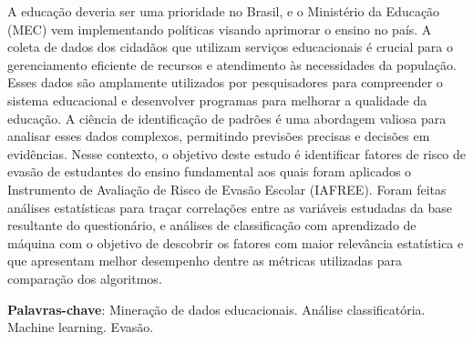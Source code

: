 
\setlength{\absparsep}{18pt} %
\begin{resumo}


A educação deveria ser uma prioridade no Brasil, e o Ministério da Educação (MEC) vem implementando políticas visando aprimorar o ensino no país. A coleta de dados dos cidadãos que utilizam serviços educacionais é crucial para o gerenciamento eficiente de recursos e atendimento às necessidades da população. Esses dados são amplamente utilizados por pesquisadores para compreender o sistema educacional e desenvolver programas para melhorar a qualidade da educação. A ciência de identificação de padrões é uma abordagem valiosa para analisar esses dados complexos, permitindo previsões precisas e decisões em evidências. Nesse contexto, o objetivo deste estudo é identificar fatores de risco de evasão de estudantes do ensino fundamental aos quais foram aplicados o Instrumento de Avaliação de Risco de Evasão Escolar (IAFREE). Foram feitas análises estatísticas para traçar correlações entre as variáveis estudadas da base resultante do questionário, e análises de classificação com aprendizado de máquina com o objetivo de descobrir os fatores com maior relevância estatística e que apresentam melhor desempenho dentre as métricas utilizadas para comparação dos algoritmos.



 \textbf{Palavras-chave}: Mineração de dados educacionais. Análise classificatória. Machine learning. Evasão.
\end{resumo}
